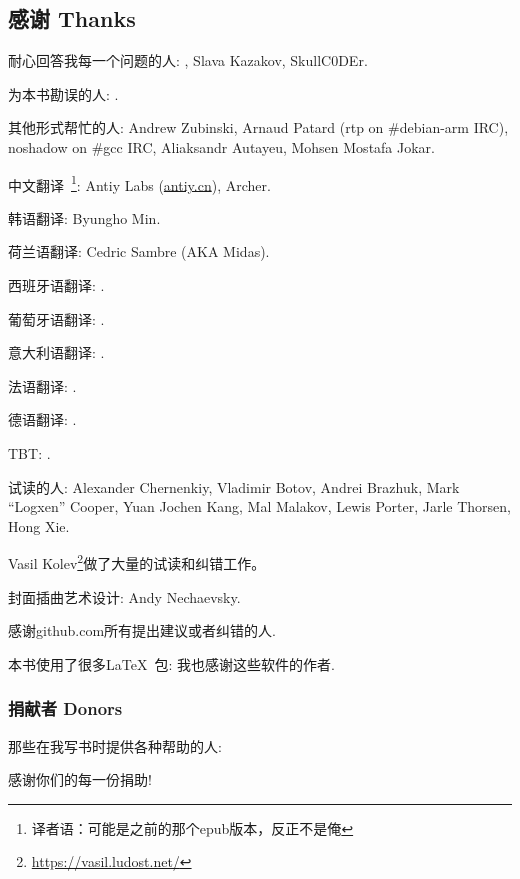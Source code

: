 \documentclass[UTF8,nofonts]{ctexart}
\begin{document}

\subsection*{感谢 Thanks}

耐心回答我每一个问题的人: \HERMIT, Slava  Kazakov, SkullC0DEr.

为本书勘误的人: \PeopleMistakesInaccuracies{}.

其他形式帮忙的人:
Andrew Zubinski,
Arnaud Patard (rtp on \#debian-arm IRC),
noshadow on \#gcc IRC,
Aliaksandr Autayeu,
Mohsen Mostafa Jokar.

中文翻译~\footnote{译者语：可能是之前的那个epub版本，反正不是俺}:
Antiy Labs (\href{http://antiy.cn}{antiy.cn}), Archer.

韩语翻译: Byungho Min.

荷兰语翻译: Cedric Sambre (AKA Midas).

西班牙语翻译: \PeopleSpanishTranslators{}.

葡萄牙语翻译: \PeoplePTBRTranslators{}.

意大利语翻译: \PeopleItalianTranslators{}.

法语翻译: \PeopleFrenchTranslators{}.

德语翻译: \PeopleGermanTranslators{}.

\ac{TBT}: \PeoplePolishTranslators{}.


试读的人:
Alexander  Chernenkiy,
Vladimir Botov,
Andrei Brazhuk,
Mark ``Logxen'' Cooper, Yuan Jochen Kang, Mal Malakov, Lewis Porter, Jarle Thorsen, Hong Xie.

Vasil Kolev\footnote{\url{https://vasil.ludost.net/}}做了大量的试读和纠错工作。

封面插曲艺术设计: Andy Nechaevsky.

感谢github.com所有提出建议或者纠错的人\FNGithubContributors{}.

本书使用了很多\LaTeX\ 包: 我也感谢这些软件的作者.

\subsubsection*{捐献者 Donors}

那些在我写书时提供各种帮助的人:



感谢你们的每一份捐助!
\end{document}
